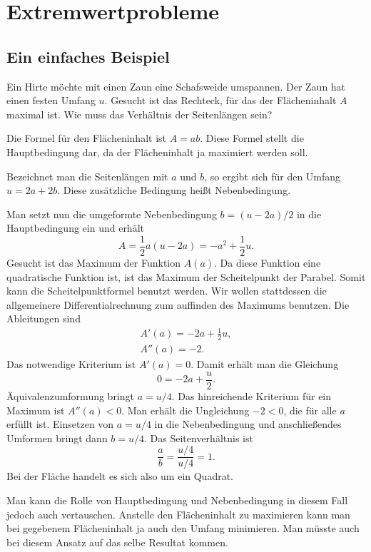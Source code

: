 \documentclass[a4paper,11pt,fleqn,twocolumn]{article}
\begin{document}

\section*{Extremwertprobleme}


\subsection*{Ein einfaches Beispiel}

Ein Hirte möchte mit einen Zaun eine Schafsweide umspannen.
Der Zaun hat einen festen Umfang \(u\). Gesucht ist das Rechteck,
für das der Flächeninhalt \(A\) maximal ist. Wie muss das Verhältnis
der Seitenlängen sein?

Die Formel für den Flächeninhalt ist \(A=ab\). Diese Formel stellt
die Hauptbedingung dar, da der Flächeninhalt ja maximiert werden soll.

Bezeichnet man die Seitenlängen mit \(a\) und \(b\), so ergibt sich
für den Umfang \(u=2a+2b\). Diese zusätzliche Bedingung heißt
Nebenbedingung.

Man setzt nun die umgeformte Nebenbedingung \(b=(u-2a)/2\) in die
Hauptbedingung ein und erhält
\[A = \frac{1}{2}a(u-2a) = -a^2+\frac{1}{2}u.\]
Gesucht ist das Maximum der Funktion \(A(a)\). Da diese Funktion
eine quadratische Funktion ist, ist das Maximum der Scheitelpunkt
der Parabel. Somit kann die Scheitelpunktformel benutzt werden.
Wir wollen stattdessen die allgemeinere Differentialrechnung zum
auffinden des Maximums benutzen. Die Ableitungen sind
\begin{gather*}
A'(a) = -2a+\frac{1}{2}u,\\
A''(a) = -2.
\end{gather*}
Das notwendige Kriterium ist \(A'(a)=0\). Damit erhält  man die
Gleichung
\[0=-2a+\frac{u}{2}.\]
Äquivalenzumformung bringt \(a=u/4\). Das hinreichende Kriterium
für ein Maximum ist \(A''(a)<0\). Man erhält die Ungleichung \(-2<0\),
die für alle \(a\) erfüllt ist. Einsetzen von \(a=u/4\) in die Nebenbedingung
und anschließendes Umformen bringt dann \(b=u/4\). Das Seitenverhältnis
ist
\[\frac{a}{b} = \frac{u/4}{u/4} = 1.\]
Bei der Fläche handelt es sich also um ein Quadrat.

Man kann die Rolle von Hauptbedingung und Nebenbedingung in diesem
Fall jedoch auch vertauschen. Anstelle den Flächeninhalt zu maximieren
kann man bei gegebenem Flächeninhalt ja auch den Umfang minimieren.
Man müsste auch bei diesem Ansatz auf das selbe Resultat kommen.
\end{document}
